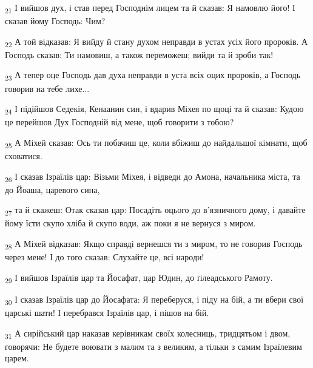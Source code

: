 \begin{tcolorbox}
\textsubscript{21} І вийшов дух, і став перед Господнім лицем та й сказав: Я намовлю його! І сказав йому Господь: Чим?
\end{tcolorbox}
\begin{tcolorbox}
\textsubscript{22} А той відказав: Я вийду й стану духом неправди в устах усіх його пророків. А Господь сказав: Ти намовиш, а також переможеш; вийди та й зроби так!
\end{tcolorbox}
\begin{tcolorbox}
\textsubscript{23} А тепер оце Господь дав духа неправди в уста всіх оцих пророків, а Господь говорив на тебе лихе...
\end{tcolorbox}
\begin{tcolorbox}
\textsubscript{24} І підійшов Седекія, Кенаанин син, і вдарив Міхея по щоці та й сказав: Кудою це перейшов Дух Господній від мене, щоб говорити з тобою?
\end{tcolorbox}
\begin{tcolorbox}
\textsubscript{25} А Міхей сказав: Ось ти побачиш це, коли вбіжиш до найдальшої кімнати, щоб сховатися.
\end{tcolorbox}
\begin{tcolorbox}
\textsubscript{26} І сказав Ізраїлів цар: Візьми Міхея, і відведи до Амона, начальника міста, та до Йоаша, царевого сина,
\end{tcolorbox}
\begin{tcolorbox}
\textsubscript{27} та й скажеш: Отак сказав цар: Посадіть оцього до в'язничного дому, і давайте йому їсти скупо хліба й скупо води, аж поки я не вернуся з миром.
\end{tcolorbox}
\begin{tcolorbox}
\textsubscript{28} А Міхей відказав: Якщо справді вернешся ти з миром, то не говорив Господь через мене! І до того сказав: Слухайте це, всі народи!
\end{tcolorbox}
\begin{tcolorbox}
\textsubscript{29} І вийшов Ізраїлів цар та Йосафат, цар Юдин, до ґілеадського Рамоту.
\end{tcolorbox}
\begin{tcolorbox}
\textsubscript{30} І сказав Ізраїлів цар до Йосафата: Я переберуся, і піду на бій, а ти вбери свої царські шати! І перебрався Ізраїлів цар, і пішов на бій.
\end{tcolorbox}
\begin{tcolorbox}
\textsubscript{31} А сирійський цар наказав керівникам своїх колесниць, тридцятьом і двом, говорячи: Не будете воювати з малим та з великим, а тільки з самим Ізраїлевим царем.
\end{tcolorbox}
